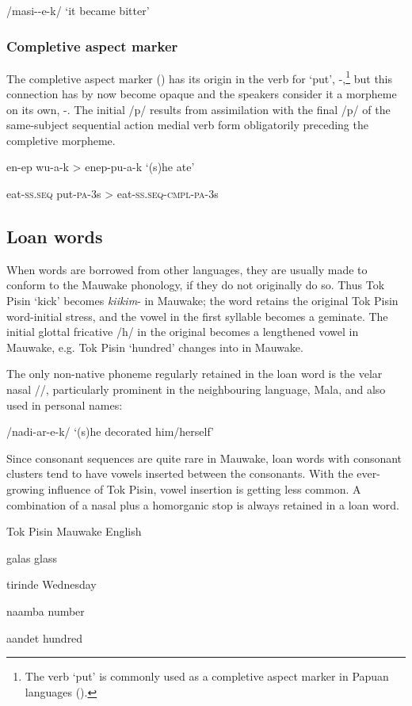 /masi--e-k/  `it became bitter'

\subsubsection{Completive aspect marker}

The completive aspect marker () has its origin in the verb for `put', \nobreakdash-,\footnote{The verb `put' is commonly used as a completive aspect marker in Papuan languages ().} but this connection has by now become opaque and the speakers consider it a morpheme on its own, -.  The initial /p/ results from assimilation with the final /p/ of the same-subject sequential action medial verb form obligatorily preceding the completive morpheme.

en-ep  wu-a-k  {{\textgreater}  enep-pu-a-k } `(s)he ate'

eat-\textsc{ss}.\textsc{seq}  put-\textsc{pa}-3s  {{\textgreater}}  eat-\textsc{ss}.\textsc{seq}-\textsc{cmpl}-\textsc{pa}-3s

\subsection{Loan words}

When words are borrowed from other languages, they are usually made to conform to the Mauwake phonology, if they do not originally do so.  Thus Tok Pisin  `kick' becomes \textit{kiikim}- in Mauwake; the word retains the original Tok Pisin word-initial stress, and the vowel in the first syllable becomes a geminate.  The initial glottal fricative /h/ in the original becomes a lengthened vowel in Mauwake, e.g. Tok Pisin  `hundred' changes into   in Mauwake.

The only non-native phoneme regularly retained in the loan word is the velar nasal /{\ng}/, particularly prominent in the neighbouring language, Mala, and also used in personal names:

/nadi{\ng-ar-e-k/}  `(s)he decorated him/herself'

Since consonant sequences are quite rare in Mauwake, loan words with consonant clusters tend to have vowels inserted between the consonants.  With the ever-growing influence of Tok Pisin, vowel insertion is getting less common.  A combination of a nasal plus a homorganic stop is always retained in a loan word.

Tok Pisin  Mauwake  English

  galas  glass

  tirinde  Wednesday

  naamba  number

  aandet  hundred

